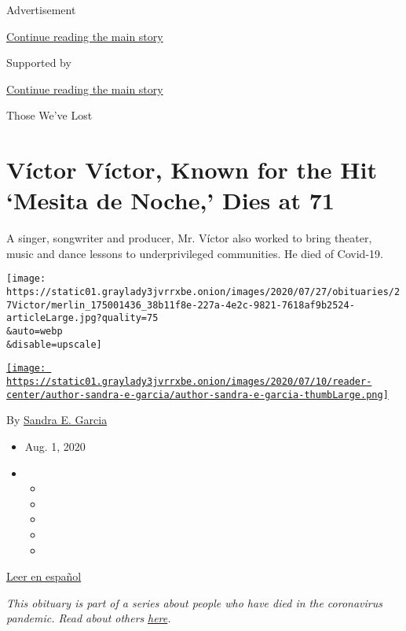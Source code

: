 Advertisement

\protect\hyperlink{after-top}{Continue reading the main story}

Supported by

\protect\hyperlink{after-sponsor}{Continue reading the main story}

Those We've Lost

\hypertarget{vuxedctor-vuxedctor-known-for-the-hit-mesita-de-noche-dies-at-71}{%
\section{Víctor Víctor, Known for the Hit `Mesita de Noche,' Dies at
71}\label{vuxedctor-vuxedctor-known-for-the-hit-mesita-de-noche-dies-at-71}}

A singer, songwriter and producer, Mr. Víctor also worked to bring
theater, music and dance lessons to underprivileged communities. He died
of Covid-19.

\texttt{[image: https://static01.graylady3jvrrxbe.onion/images/2020/07/27/obituaries/27Victor/merlin\_175001436\_38b11f8e-227a-4e2c-9821-7618af9b2524-articleLarge.jpg?quality=75\\\&auto=webp\\\&disable=upscale]}

\href{https://www.nytimes3xbfgragh.onion/by/sandra-e-garcia}{\texttt{[image: https://static01.graylady3jvrrxbe.onion/images/2020/07/10/reader-center/author-sandra-e-garcia/author-sandra-e-garcia-thumbLarge.png]}}

By \href{https://www.nytimes3xbfgragh.onion/by/sandra-e-garcia}{Sandra
E. Garcia}

\begin{itemize}
\item
  Aug. 1, 2020
\item
  \begin{itemize}
  \item
  \item
  \item
  \item
  \item
  \end{itemize}
\end{itemize}

\href{https://www.nytimes3xbfgragh.onion/es/2020/08/03/espanol/cultura/victor-victor-murio-coronavirus.html}{Leer
en español}

\emph{This obituary is part of a series about people who have died in
the coronavirus pandemic. Read about others}
\href{https://www.nytimes3xbfgragh.onion/interactive/2020/obituaries/people-died-coronavirus-obituaries.html}{\emph{here}}\emph{.}

